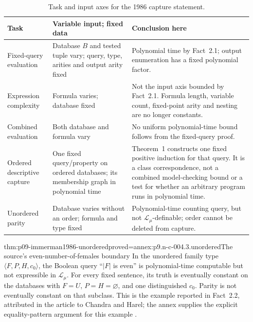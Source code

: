 \begin{table}[htbp]
\centering\small
\begin{tabular}{@{}p{}p{}p{}@{}}
\toprule
Task & Variable input; fixed data & Conclusion here \\
\midrule
Fixed-query evaluation & Database \(B\) and tested tuple vary;
query, type, arities and output arity fixed & Polynomial time by
Fact~2.1; output enumeration has a fixed polynomial factor. \\
Expression complexity & Formula varies; database fixed & Not the
input axis bounded by Fact~2.1. Formula length, variable count,
fixed-point arity and nesting are no longer constants. \\
Combined evaluation & Both database and formula vary & No uniform
polynomial-time bound follows from the fixed-query proof. \\
Ordered descriptive capture & One fixed query/property on ordered
databases; its membership graph in polynomial time & Theorem~1 constructs
one fixed positive induction for that query. It is a class correspondence,
not a combined model-checking bound or a test for whether an arbitrary
program runs in polynomial time. \\
Unordered parity & Database varies without an order;
formula and type fixed & Polynomial-time counting query, but not
\(\mathcal L_\mu\)-definable; order cannot be deleted from capture. \\
\bottomrule
\end{tabular}
\caption{Task and input axes for the 1986 capture statement.}
\label{tab:p09-immerman1986-input-axes}
\end{table}

\begin{hbtheorem}{thm:p09-immerman1986-unordered}{proved=annex:p9.n-c-004.3.unordered}{The source's even-number-of-females boundary}
In the unordered family type \(\langle F,P,H,c_0\rangle\), the
Boolean query ``\(\lvert F\rvert\) is even'' is polynomial-time
computable but not expressible in \(\mathcal L_\mu\).
For every fixed sentence, its truth is eventually constant on the databases
with \(F=U\), \(P=H=\varnothing\), and one distinguished \(c_0\).
Parity is not eventually constant on that subclass.  This is the example
reported in Fact~2.2, attributed in the article to Chandra and Harel;
the annex supplies the explicit equality-pattern argument for this example
\cite[sec.~2, fact~2.2]{Immerman1986}.
\end{hbtheorem}


